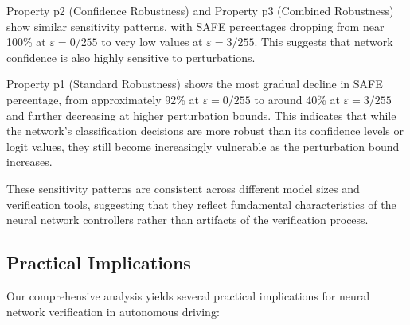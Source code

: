 Property p2 (Confidence Robustness) and Property p3 (Combined Robustness) show similar sensitivity patterns, with SAFE percentages dropping from near 100\% at $\varepsilon = 0/255$ to very low values at $\varepsilon = 3/255$. This suggests that network confidence is also highly sensitive to perturbations.

Property p1 (Standard Robustness) shows the most gradual decline in SAFE percentage, from approximately 92\% at $\varepsilon = 0/255$ to around 40\% at $\varepsilon = 3/255$ and further decreasing at higher perturbation bounds. This indicates that while the network's classification decisions are more robust than its confidence levels or logit values, they still become increasingly vulnerable as the perturbation bound increases.

These sensitivity patterns are consistent across different model sizes and verification tools, suggesting that they reflect fundamental characteristics of the neural network controllers rather than artifacts of the verification process.

\subsection{Practical Implications}

Our comprehensive analysis yields several practical implications for neural network verification in autonomous driving:

